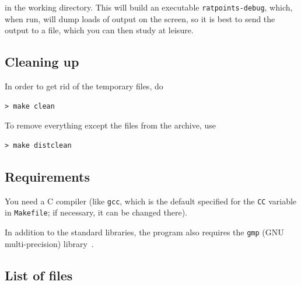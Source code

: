 \documentclass[12pt,a4paper,oneside]{amsart}
\begin{document}
in the working directory. This will build an executable \texttt{ratpoints-debug},
which, when run, will dump loads of output on the screen, so it is best
to send the output to a file, which you can then study at leisure.

\subsection{Cleaning up}

In order to get rid of the temporary files, do

\begin{verbatim}
> make clean
\end{verbatim}

To remove everything except the files from the archive, use

\begin{verbatim}
> make distclean
\end{verbatim}

\subsection{Requirements}

You need a C compiler (like \texttt{gcc}, which is the default specified
for the \texttt{CC} variable in \texttt{Makefile}; if necessary, it can be
changed there).

In addition to the standard libraries, the program also requires the
\texttt{gmp} (GNU multi-precision) library~\cite{gmp}.

\subsection{List of files}
\end{document}
